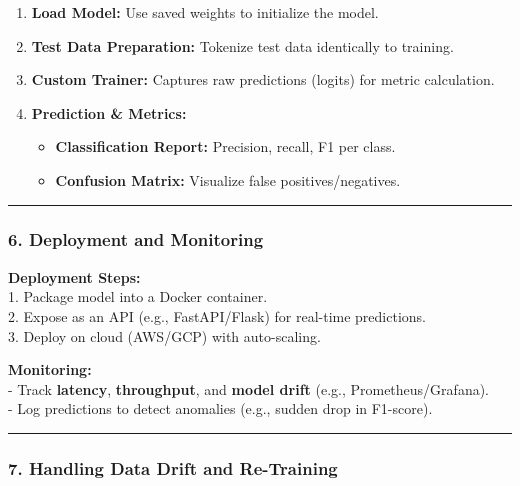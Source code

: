 \documentclass[
]{article}
\providecommand{\tightlist}{%
  \setlength{\itemsep}{0pt}\setlength{\parskip}{0pt}}
\begin{document}
\begin{enumerate}
\def\labelenumi{\arabic{enumi}.}
\tightlist
\item
  \textbf{Load Model:} Use saved weights to initialize the model.\\
\item
  \textbf{Test Data Preparation:} Tokenize test data identically to
  training.\\
\item
  \textbf{Custom Trainer:} Captures raw predictions (logits) for metric
  calculation.\\
\item
  \textbf{Prediction \& Metrics:}

  \begin{itemize}
  \tightlist
  \item
    \textbf{Classification Report:} Precision, recall, F1 per class.\\
  \item
    \textbf{Confusion Matrix:} Visualize false positives/negatives.
  \end{itemize}
\end{enumerate}

\begin{center}\rule{0.5\linewidth}{0.5pt}\end{center}

\subsubsection{\texorpdfstring{\textbf{6. Deployment and
Monitoring}}{6. Deployment and Monitoring}}\label{deployment-and-monitoring}

\textbf{Deployment Steps:}\\
1. Package model into a Docker container.\\
2. Expose as an API (e.g., FastAPI/Flask) for real-time predictions.\\
3. Deploy on cloud (AWS/GCP) with auto-scaling.

\textbf{Monitoring:}\\
- Track \textbf{latency}, \textbf{throughput}, and \textbf{model drift}
(e.g., Prometheus/Grafana).\\
- Log predictions to detect anomalies (e.g., sudden drop in F1-score).

\begin{center}\rule{0.5\linewidth}{0.5pt}\end{center}

\subsubsection{\texorpdfstring{\textbf{7. Handling Data Drift and
Re-Training}}{7. Handling Data Drift and Re-Training}}\label{handling-data-drift-and-re-training}
\end{document}
